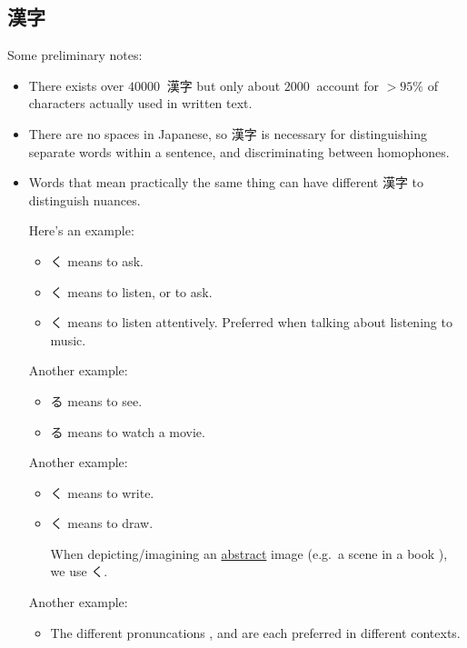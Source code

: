 \documentclass[../nihongo-gakushuu-kyouzai.tex]{subfiles}
\begin{document}
\subsection{漢字}
Some preliminary notes:
\begin{itemize}
    \item There exists over $\SI{40000}{}$ 漢字 but only about $\SI{2000}{}$ account for $>95\%$ of characters actually used in written text.
    \item There are no spaces in Japanese, so 漢字 is necessary for distinguishing separate words within a sentence, and discriminating between homophones.
    \item Words that mean practically the same thing can have different 漢字 to distinguish nuances.

    Here's an example:
    \begin{itemize}
        \item {}く means to ask.
        \item {}く means to listen, or to ask.
        \item {}く means to listen attentively. Preferred when talking about listening to music.
    \end{itemize}

    Another example:
    \begin{itemize}
        \item {}る means to see.
        \item {}る means to watch a movie.
    \end{itemize}

    Another example:
    \begin{itemize}
        \item {}く means to write.
        \item {}く means to draw.

        When depicting/imagining an \ul{abstract} image (e.g.\ a scene in a book ), we use く.
    \end{itemize}

    Another example:
    \begin{itemize}
        \item The different pronuncations ,  and  are each preferred in different contexts.
    \end{itemize}
\end{itemize}
\end{document}
